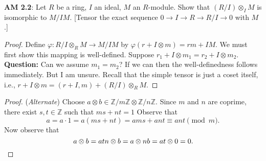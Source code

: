 \documentclass[8pt]{amsart}
\theoremstyle{plain}%
\theoremstyle{definition}
\theoremstyle{remark}
\numberwithin{equation}{section}
\newcommand{\Z}{\mathbb{Z}}
\begin{document}
\textbf{ AM 2.2}: Let $R$ be a ring, $I$ an ideal, $M$ an $R$-module. Show that $(R/I) \otimes_IM$ is isomorphic to $M/IM$. [Tensor the exact sequence $0 \longrightarrow I \longrightarrow R \longrightarrow R/I \longrightarrow 0$ with $M$.]
	\begin{proof}
		Define $\varphi : R/I \otimes_RM \to M/IM$ by $\varphi(r + I \otimes m) = rm + IM$. We must first show this mapping is well-defined. Suppose $r_1 + I \otimes m_1 = r_2 + I \otimes m_2$.\\

		\textbf{Question:} Can we assume $m_1 = m_2$? If we can then the well-definedness follows immediately. But I am unsure. Recall that the simple tensor is just a coset itself, i.e., $r + I \otimes m = (r + I, m) + (R/I) \otimes_RM$.
	\end{proof}

	\begin{proof} (\textit{Alternate}) Choose $a \otimes b \in \Z/m\Z \otimes \Z/n\Z$. Since $m$ and $n$ are coprime, there exist $s, t \in \Z$ such that $ms + nt = 1$ Observe that $$a = a \cdot 1 = a(ms + nt) = ams + ant \equiv ant \pmod m.$$ Now observe that $$a \otimes b = atn \otimes b = a \otimes nb = at \otimes 0 = 0. \qedhere $$

	\end{proof}
\end{document}

